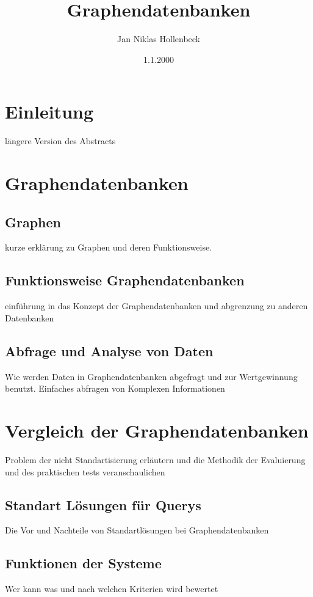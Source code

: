 \documentclass[a4paper,12pt,headsepline]{report}
\title{Graphendatenbanken}
\author{Jan Niklas Hollenbeck}
\date{1.1.2000}
\begin{document}

 
 
 
 
 
\tableofcontents %

\pagestyle{plain} %

\chapter{Einleitung}
längere Version des Abstracts 
\chapter{Graphendatenbanken}
\section{Graphen}
kurze erklärung zu Graphen und deren Funktionsweise.
\section{Funktionsweise Graphendatenbanken}
einführung in das Konzept der Graphendatenbanken
und abgrenzung zu anderen Datenbanken
\section{Abfrage und Analyse von Daten}
Wie werden Daten in Graphendatenbanken abgefragt und zur Wertgewinnung benutzt.
Einfaches abfragen von Komplexen Informationen

\chapter{Vergleich der Graphendatenbanken}
Problem der nicht Standartisierung erläutern und die Methodik der Evaluierung und des praktischen tests veranschaulichen
\section{Standart Lösungen für Querys}
Die Vor und Nachteile von Standartlösungen bei Graphendatenbanken
\section{Funktionen der Systeme}
Wer kann was und nach welchen Kriterien wird bewertet 
\end{document}
